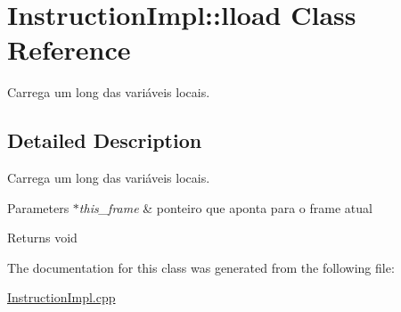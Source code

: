 \hypertarget{class_instruction_impl_1_1lload}{}\section{Instruction\+Impl\+:\+:lload Class Reference}
\label{class_instruction_impl_1_1lload}


Carrega um long das variáveis locais.  




\subsection{Detailed Description}
Carrega um long das variáveis locais. 


\begin{DoxyParams}{Parameters}
{\em $\ast$this\+\_\+frame} & ponteiro que aponta para o frame atual \\
\hline
\end{DoxyParams}
\begin{DoxyReturn}{Returns}
void 
\end{DoxyReturn}


The documentation for this class was generated from the following file\+:\begin{DoxyCompactItemize}
\item 
\hyperlink{_instruction_impl_8cpp}{Instruction\+Impl.\+cpp}\end{DoxyCompactItemize}
